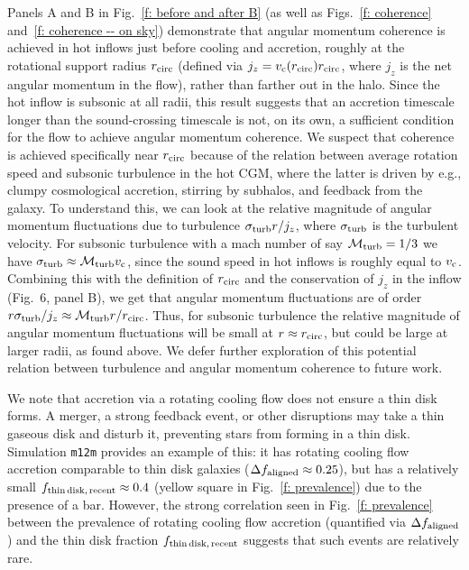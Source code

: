 \documentclass[fleqn,usenatbib]{mnras}
\newcommand{\fthin}{f_{\rm thin\,disk,\,recent}}
\newcommand{\Rcirc}[0]{r_{\rm circ}}
\newcommand{\vc}[0]{v_{\rm c}}
\newcommand{\mturb}[0]{\mathcal{M}_{\rm turb}}
\begin{document}
Panels A and B in Fig.~\ref{f: before and after B} (as well as Figs.~\ref{f: coherence} and~\ref{f: coherence -- on sky}) demonstrate that angular momentum coherence is achieved in hot inflows just before cooling and accretion, roughly at the rotational support radius $\Rcirc$ (defined via $j_z=\vc(\Rcirc)\Rcirc$, where $j_z$ is the net angular momentum in the flow), rather than farther out in the halo.
Since the hot inflow is subsonic at all radii, this result suggests that an accretion timescale longer than the sound-crossing timescale is not, on its own, a sufficient condition for the flow to achieve angular momentum coherence.
We suspect that coherence is achieved specifically near $\Rcirc$ because of the relation between average rotation speed and subsonic turbulence in the hot CGM, where the latter is driven by e.g., clumpy cosmological accretion, stirring by subhalos, and feedback from the galaxy.
To understand this, we can look at the relative magnitude of angular momentum fluctuations due to turbulence $\sigma_{\rm turb} r / j_z$, where $\sigma_{\rm turb}$ is the turbulent velocity.
For subsonic turbulence with a mach number of say $\mturb=1/3$ we have $\sigma_{\rm turb}\approx \mturb\vc$, since the sound speed in hot inflows is roughly equal to $\vc$.
Combining this with the definition of $\Rcirc$ and the conservation of $j_z$ in the inflow (Fig.~6, panel B), we get that angular momentum fluctuations are of order $r \sigma_{\rm turb}/j_z \approx \mturb r/ \Rcirc$.
Thus, for subsonic turbulence the relative magnitude of angular momentum fluctuations will be small at $r\approx\Rcirc$, but could be large at larger radii, as found above.
We defer further exploration of this potential relation between turbulence and angular momentum coherence to future work. 

We note that accretion via a rotating cooling flow does not ensure a thin disk forms. 
A merger, a strong feedback event, or other disruptions may take a thin gaseous disk and disturb it, preventing stars from forming in a thin disk.
Simulation \texttt{m12m} provides an example of this:
it has rotating cooling flow accretion comparable to thin disk galaxies ($\Delta f_{\rm aligned} \approx 0.25$), but has a relatively small $\fthin \approx 0.4$ (yellow square in Fig.~\ref{f: prevalence}) due to the presence of a bar.
However, the strong correlation seen in Fig.~\ref{f: prevalence} between the prevalence of rotating cooling flow accretion (quantified via $\Delta f_{\rm aligned}$) and the thin disk fraction $\fthin$ suggests that such events are relatively rare. 
\end{document}
